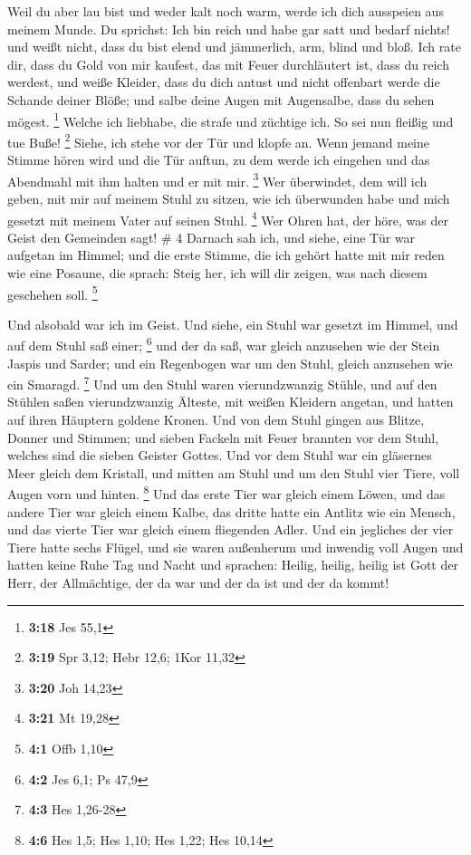  Weil du aber lau bist und weder kalt noch warm, werde
ich dich ausspeien aus meinem Munde.  Du sprichst: Ich
bin reich und habe gar satt und bedarf nichts! und weißt nicht, dass du
bist elend und jämmerlich, arm, blind und bloß.  Ich rate
dir, dass du Gold von mir kaufest, das mit Feuer durchläutert ist, dass
du reich werdest, und weiße Kleider, dass du dich antust und nicht
offenbart werde die Schande deiner Blöße; und salbe deine Augen mit
Augensalbe, dass du sehen mögest. \footnote{\textbf{3:18} Jes 55,1}
 Welche ich liebhabe, die strafe und züchtige ich. So sei
nun fleißig und tue Buße! \footnote{\textbf{3:19} Spr 3,12; Hebr 12,6;
  1Kor 11,32}  Siehe, ich stehe vor der Tür und klopfe
an. Wenn jemand meine Stimme hören wird und die Tür auftun, zu dem werde
ich eingehen und das Abendmahl mit ihm halten und er mit mir.
\footnote{\textbf{3:20} Joh 14,23}  Wer überwindet, dem
will ich geben, mit mir auf meinem Stuhl zu sitzen, wie ich überwunden
habe und mich gesetzt mit meinem Vater auf seinen Stuhl. \footnote{\textbf{3:21}
  Mt 19,28}  Wer Ohren hat, der höre, was der Geist den
Gemeinden sagt! \# 4  Darnach sah ich, und siehe, eine Tür
war aufgetan im Himmel; und die erste Stimme, die ich gehört hatte mit
mir reden wie eine Posaune, die sprach: Steig her, ich will dir zeigen,
was nach diesem geschehen soll. \footnote{\textbf{4:1} Offb 1,10}

 Und alsobald war ich im Geist. Und siehe, ein Stuhl war
gesetzt im Himmel, und auf dem Stuhl saß einer; \footnote{\textbf{4:2}
  Jes 6,1; Ps 47,9}  und der da saß, war gleich anzusehen
wie der Stein Jaspis und Sarder; und ein Regenbogen war um den Stuhl,
gleich anzusehen wie ein Smaragd. \footnote{\textbf{4:3} Hes 1,26-28}
 Und um den Stuhl waren vierundzwanzig Stühle, und auf den
Stühlen saßen vierundzwanzig Älteste, mit weißen Kleidern angetan, und
hatten auf ihren Häuptern goldene Kronen.  Und von dem
Stuhl gingen aus Blitze, Donner und Stimmen; und sieben Fackeln mit
Feuer brannten vor dem Stuhl, welches sind die sieben Geister Gottes.
 Und vor dem Stuhl war ein gläsernes Meer gleich dem
Kristall, und mitten am Stuhl und um den Stuhl vier Tiere, voll Augen
vorn und hinten. \footnote{\textbf{4:6} Hes 1,5; Hes 1,10; Hes 1,22; Hes
  10,14}  Und das erste Tier war gleich einem Löwen, und
das andere Tier war gleich einem Kalbe, das dritte hatte ein Antlitz wie
ein Mensch, und das vierte Tier war gleich einem fliegenden Adler.
 Und ein jegliches der vier Tiere hatte sechs Flügel, und
sie waren außenherum und inwendig voll Augen und hatten keine Ruhe Tag
und Nacht und sprachen: Heilig, heilig, heilig ist Gott der Herr, der
Allmächtige, der da war und der da ist und der da kommt!

